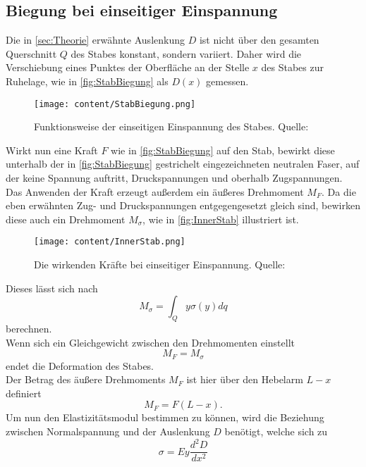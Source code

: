 \subsection{Biegung bei einseitiger Einspannung}
\label{subsec:EinseitigeEinspannung}
Die in \autoref{sec:Theorie} erwähnte Auslenkung $D$ ist nicht über den gesamten Querschnitt $Q$ des Stabes konstant,
sondern variiert. Daher wird die Verschiebung eines Punktes der Oberfläche an der Stelle $x$ des Stabes zur Ruhelage, wie in \autoref{fig:StabBiegung}
als $D(x)$ gemessen.
\begin{figure}[H]
    \centering
    \texttt{[image: content/StabBiegung.png]}
    \caption{Funktionsweise der einseitigen Einspannung des Stabes. Quelle: \cite{sample}}  %
    \label{fig:StabBiegung}
\end{figure}
Wirkt nun eine Kraft $F$ wie in \autoref{fig:StabBiegung} auf den Stab, bewirkt diese unterhalb der in \autoref{fig:StabBiegung}
gestrichelt eingezeichneten neutralen Faser, auf der keine Spannung auftritt, Druckspannungen und oberhalb Zugspannungen.
Das Anwenden der Kraft erzeugt außerdem ein äußeres Drehmoment $M_F$. Da die eben erwähnten Zug- und Druckspannungen entgegengesetzt gleich
sind, bewirken diese auch ein Drehmoment $M_{\sigma}$, wie in \autoref{fig:InnerStab} illustriert ist.
\begin{figure}[H]
    \centering
    \texttt{[image: content/InnerStab.png]}
    \caption{Die wirkenden Kräfte bei einseitiger Einspannung. Quelle: \cite{sample}}  %
    \label{fig:InnerStab}
\end{figure}
Dieses lässt sich nach
\begin{equation}
    \label{eqn:MSigma}
    M_{\sigma} = \int_Q y\sigma(y)dq
\end{equation}
berechnen. \\
Wenn sich ein Gleichgewicht zwischen den Drehmomenten 
einstellt
\begin{equation}
    \label{eqn:MGleich}
    M_F = M_{\sigma}
\end{equation}
endet die Deformation des Stabes.\\
Der Betrag des äußere Drehmoments $M_F$ ist hier über den Hebelarm $L-x$ definiert
\begin{equation}
    \label{eqn:MF}
    M_F = F(L-x).
\end{equation}
Um nun den Elastizitätsmodul bestimmen zu können, wird die Beziehung zwischen Normalspannung und der Auslenkung $D$ benötigt,
welche sich zu
\begin{equation}
    \label{eqn:SigNormD}
    \sigma = Ey\frac{d^2D}{dx^2}
\end{equation}
